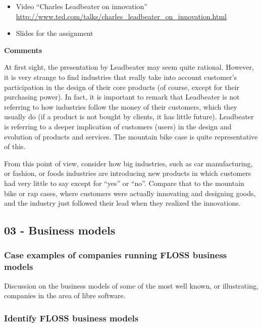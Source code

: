 \documentclass[a4paper]{article}
\begin{document}
\begin{itemize}
\item Video ``Charles Leadbeater on innovation'' \\
  \url{http://www.ted.com/talks/charles_leadbeater_on_innovation.html}
\item Slides for the assignment
\end{itemize}

\textbf{Comments}

At first sight, the presentation by Leadbeater may seem quite rational. However, it is very strange to find industries that really take into account customer's participation in the design of their core products (of course, except for their purchasing power). In fact, it is important to remark that Leadbeater is not referring to how industries follow the money of their customers, which they usually do (if a product is not bought by clients, it has little future). Leadbeater is referring to a deeper implication of customers (users) in the design and evolution of products and services. The mountain bike case is quite representative of this.

From this point of view, consider how big industries, such as car manufacturing, or fashion, or foods industries are introducing new products in which customers had very little to say except for ``yes'' or ``no''. Compare that to the mountain bike or rap cases, where customers were actually innovating and designing goods, and the industry just followed their lead when they realized the innovations.
\subsection{03 - Business models}

\subsubsection{Case examples of companies running FLOSS business models}
\label{sub:business-cases}

Discussion on the business models of some of the most well known, or illustrating, companies in the area of libre software.

\subsubsection{Identify FLOSS business models}
\label{sub:business-models}
\end{document}
